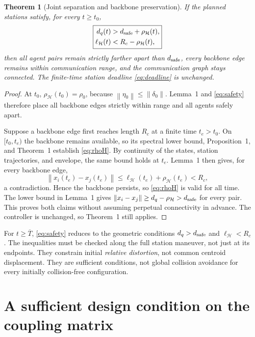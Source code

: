\documentclass[11pt,a4paper]{article}
\newtheorem{theorem}{Theorem}
\theoremstyle{remark}
\newcommand{\norm}[1]{\left\lVert#1\right\rVert}
\begin{document}
\begin{theorem}[Joint separation and backbone preservation]
If the planned stations satisfy, for every $t\ge t_0$,
\begin{equation}
\boxed{
\begin{aligned}
d_q(t)&>d_{\rm safe}+\rho_{\mathcal H}(t),\\
\ell_{\mathcal H}(t)&<R_c-\rho_{\mathcal H}(t),
\end{aligned}}
\label{eq:safety}
\end{equation}
then all agent pairs remain strictly farther apart than $d_{\rm safe}$, every backbone edge remains within communication range, and the communication graph stays connected. The finite-time station deadline \eqref{eq:deadline} is unchanged.
\end{theorem}
\begin{proof}
At $t_0$, $\rho_{\mathcal H}(t_0)=\rho_0$, because $\norm{\eta_0}\le\norm{\delta_0}$. Lemma~1 and \eqref{eq:safety} therefore place all backbone edges strictly within range and all agents safely apart.

Suppose a backbone edge first reaches length $R_c$ at a finite time $t_e>t_0$. On $[t_0,t_e)$ the backbone remains available, so its spectral lower bound, Proposition~1, and Theorem~1 establish \eqref{eq:rhoH}. By continuity of the states, station trajectories, and envelope, the same bound holds at $t_e$. Lemma~1 then gives, for every backbone edge,
\[
\norm{x_i(t_e)-x_j(t_e)}
\le\ell_{\mathcal H}(t_e)+\rho_{\mathcal H}(t_e)<R_c,
\]
a contradiction. Hence the backbone persists, so \eqref{eq:rhoH} is valid for all time. The lower bound in Lemma~1 gives
$\norm{x_i-x_j}\ge d_q-\rho_{\mathcal H}>d_{\rm safe}$ for every pair. This proves both claims without assuming perpetual connectivity in advance. The controller is unchanged, so Theorem~1 still applies.
\end{proof}

For $t\ge\overline T$, \eqref{eq:safety} reduces to the geometric conditions $d_q>d_{\rm safe}$ and $\ell_{\mathcal H}<R_c$. The inequalities must be checked along the full station maneuver, not just at its endpoints. They constrain initial \emph{relative distortion}, not common centroid displacement. They are sufficient conditions, not global collision avoidance for every initially collision-free configuration.

\section{A sufficient design condition on the coupling matrix}
\end{document}
